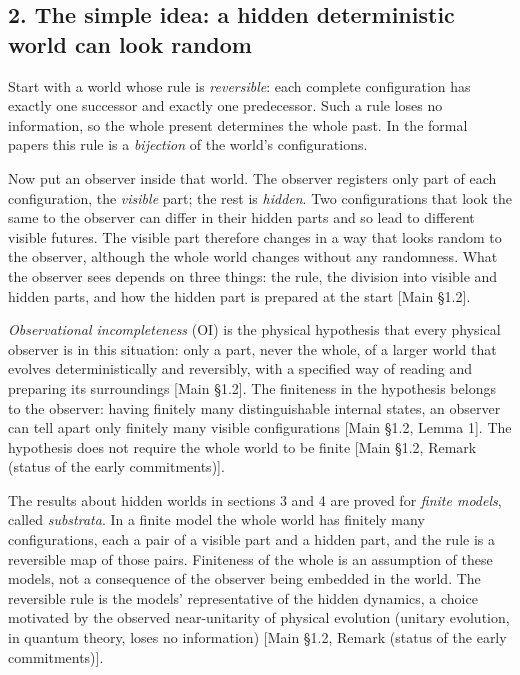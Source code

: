 \documentclass[
]{article}
\begin{document}
\hypertarget{the-simple-idea-a-hidden-deterministic-world-can-look-random}{%
\subsection{2. The simple idea: a hidden deterministic world can look
random}\label{the-simple-idea-a-hidden-deterministic-world-can-look-random}}

Start with a world whose rule is \emph{reversible}: each complete
configuration has exactly one successor and exactly one predecessor.
Such a rule loses no information, so the whole present determines the
whole past. In the formal papers this rule is a \emph{bijection} of the
world's configurations.

Now put an observer inside that world. The observer registers only part
of each configuration, the \emph{visible} part; the rest is
\emph{hidden}. Two configurations that look the same to the observer can
differ in their hidden parts and so lead to different visible futures.
The visible part therefore changes in a way that looks random to the
observer, although the whole world changes without any randomness. What
the observer sees depends on three things: the rule, the division into
visible and hidden parts, and how the hidden part is prepared at the
start {[}Main §1.2{]}.

\emph{Observational incompleteness} (OI) is the physical hypothesis that
every physical observer is in this situation: only a part, never the
whole, of a larger world that evolves deterministically and reversibly,
with a specified way of reading and preparing its surroundings {[}Main
§1.2{]}. The finiteness in the hypothesis belongs to the observer:
having finitely many distinguishable internal states, an observer can
tell apart only finitely many visible configurations {[}Main §1.2, Lemma
1{]}. The hypothesis does not require the whole world to be finite
{[}Main §1.2, Remark (status of the early commitments){]}.

The results about hidden worlds in sections 3 and 4 are proved for
\emph{finite models}, called \emph{substrata}. In a finite model the
whole world has finitely many configurations, each a pair of a visible
part and a hidden part, and the rule is a reversible map of those pairs.
Finiteness of the whole is an assumption of these models, not a
consequence of the observer being embedded in the world. The reversible
rule is the models' representative of the hidden dynamics, a choice
motivated by the observed near-unitarity of physical evolution (unitary
evolution, in quantum theory, loses no information) {[}Main §1.2, Remark
(status of the early commitments){]}.
\end{document}
